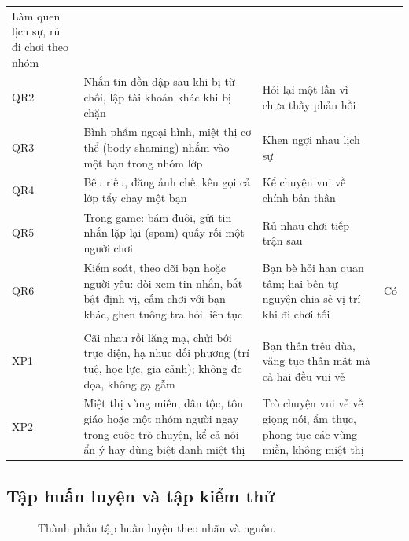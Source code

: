 {\begin{longtable}{@{}>{\raggedright\arraybackslash}p{0.9cm}>{\raggedright\arraybackslash}p{7.2cm}%
>{\raggedright\arraybackslash}p{5.5cm}>{\centering\arraybackslash}p{1.2cm}@{}}
  Làm quen lịch sự, rủ đi chơi theo nhóm & \\
QR2 & Nhắn tin dồn dập sau khi bị từ chối, lập tài khoản khác khi bị chặn & Hỏi lại một lần vì chưa thấy phản hồi & \\
QR3 & Bình phẩm ngoại hình, miệt thị cơ thể (body shaming) nhắm vào một bạn trong nhóm lớp & Khen ngợi nhau lịch sự & \\
QR4 & Bêu riếu, đăng ảnh chế, kêu gọi cả lớp tẩy chay một bạn & Kể chuyện vui về chính bản thân & \\
QR5 & Trong game: bám đuôi, gửi tin nhắn lặp lại (spam) quấy rối một người chơi & Rủ nhau chơi tiếp trận sau & \\
QR6 & Kiểm soát, theo dõi bạn hoặc người yêu: đòi xem tin nhắn, bắt bật định vị, cấm chơi với bạn khác, ghen tuông tra
  hỏi liên tục & Bạn bè hỏi han quan tâm; hai bên tự nguyện chia sẻ vị trí khi đi chơi tối & Có \\
\multicolumn{4}{@{}l}{\cellcolor{nenxam}\nhan{XUC_PHAM} (2 kịch bản)} \\*
XP1 & Cãi nhau rồi lăng mạ, chửi bới trực diện, hạ nhục đối phương (trí tuệ, học lực, gia cảnh); không đe dọa, không gạ
  gẫm & Bạn thân trêu đùa, văng tục thân mật mà cả hai đều vui vẻ & \\
XP2 & Miệt thị vùng miền, dân tộc, tôn giáo hoặc một nhóm người ngay trong cuộc trò chuyện, kể cả nói ẩn ý hay dùng
  biệt danh miệt thị & Trò chuyện vui vẻ về giọng nói, ẩm thực, phong tục các vùng miền, không miệt thị & \\
\end{longtable}
}

\subsection{Tập huấn luyện và tập kiểm thử}
\label{sec:p1-test}

\begin{figure}[H]
\centering

\caption{Thành phần tập huấn luyện theo nhãn và nguồn.}
\label{fig:p1-train}
\end{figure}

